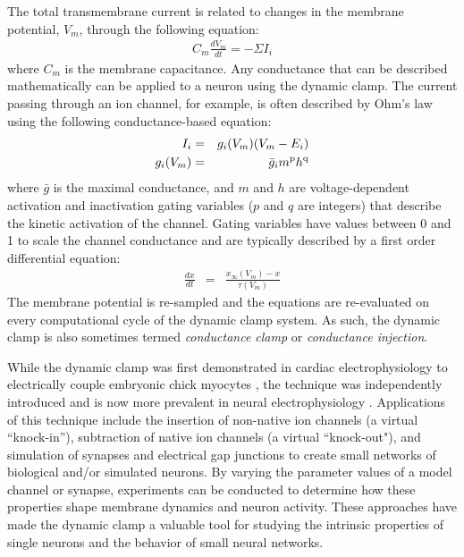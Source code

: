 The total transmembrane current is related to changes in the membrane potential, $V_{m}$, through the following equation: 
\begin{eqnarray}
C_{m} \frac{dV_{m}}{dt} =-\Sigma I_{i}
\end{eqnarray}
where $C_{m}$ is the membrane capacitance. Any conductance that can be described mathematically can be applied to a neuron using the dynamic clamp. The current passing through an ion channel, for example, is often described by Ohm's law using the following conductance-based equation: 
\begin{eqnarray}\index{ion channel model}
I_{i} & = & g_{i}(V_{m})(V_{m}-E_{i}) \\
g_{i}(V_{m}) & = & \bar{g}_{i}m^{\textrm{p}}h^{\textrm{q}} 
\end{eqnarray}
where $\bar{g}$ is the maximal conductance, and $m$ and $h$ are voltage-dependent activation and inactivation gating variables ($p$ and $q$ are integers) that describe the kinetic activation of the channel. Gating variables have values between 0 and 1 to scale the channel conductance and are typically described by a first order differential equation:
\begin{eqnarray}
\frac{dx}{dt} & = & \frac{x_{\infty}(V_{m})-x}{\tau (V_{m})} 
\end{eqnarray}
The membrane potential is re-sampled and the equations are re-evaluated on every computational cycle of the dynamic clamp system. As such, the dynamic clamp is also sometimes termed \textit{conductance clamp} or \textit{conductance injection}. 

While the dynamic clamp was first demonstrated in cardiac electrophysiology to electrically couple embryonic chick myocytes \cite{Wilders:2006p930}, the technique was independently introduced \cite{Robinson:1993p1193,Sharp:1993p983} and is now more prevalent in neural electrophysiology \cite{Economo:2010p1795,Prinz:2004p985,Goaillard:2006p1175}. Applications of this technique include the insertion of non-native ion channels (a virtual ``knock-in''), subtraction of native ion channels (a virtual ``knock-out"), and simulation of synapses and electrical gap junctions to create small networks of biological and/or simulated neurons. By varying the parameter values of a model channel or synapse, experiments can be conducted to determine how these properties shape membrane dynamics and neuron activity. These approaches have made the dynamic clamp a valuable tool for studying the intrinsic properties of single neurons and the behavior of small neural networks. 

